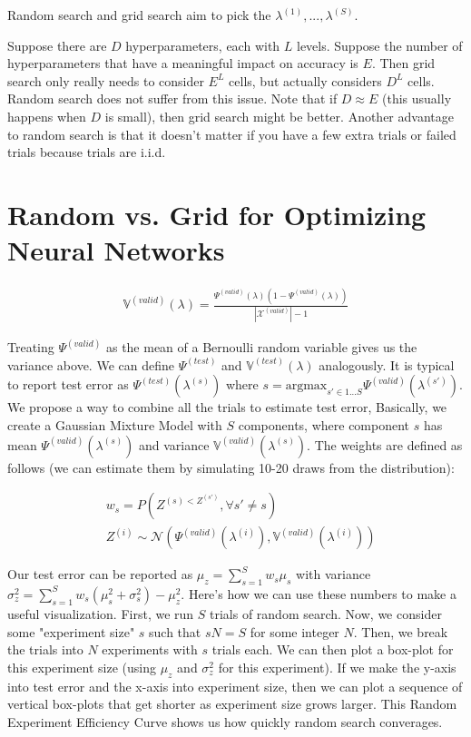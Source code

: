 \documentclass[a4paper]{article}
\begin{document}
Random search and grid search aim to pick the $\lambda^{(1)}, ...,
\lambda^{(S)}$.

Suppose there are $D$ hyperparameters, each with $L$ levels. Suppose the number
of hyperparameters that have a meaningful impact on accuracy is $E$. Then grid
search only really needs to consider $E^L$ cells, but actually considers $D^L$
cells. Random search does not suffer from this issue. Note that if
$D \approx E$ (this usually happens when $D$ is small), then grid search might
be better. Another advantage to random search is that it doesn't matter if you
have a few extra trials or failed trials because trials are i.i.d.

\section{Random vs. Grid for Optimizing Neural Networks}

\begin{align}
  \mathbb{V}^{(valid)}(\lambda) = \frac{\Psi^{(valid)}(\lambda) (1 -
  \Psi^{(valid)}(\lambda))}{|\mathcal{X}^{(valid)}| - 1}
\end{align}

Treating $\Psi^{(valid)}$ as the mean of a Bernoulli random variable gives us
the variance above. We can define $\Psi^{(test)}$ and
$\mathbb{V}^{(test)}(\lambda)$ analogously. It is typical to report test error
as $\Psi^{(test)}(\lambda^{(s)})$ where $s = \text{argmax}_{s' \in 1...S}{
\Psi^{(valid)}(\lambda^{(s')})}$. We propose a way to combine all the
trials to estimate test error, Basically, we create a Gaussian Mixture Model
with $S$ components, where component $s$ has mean
$\Psi^{(valid)}(\lambda^{(s)})$ and variance
$\mathbb{V}^{(valid)}(\lambda^{(s)})$. The weights are defined as follows
(we can estimate them by simulating 10-20 draws from the distribution):

\begin{align}
  & w_s = P(Z^{(s) < Z^{(s')}}, \forall s' \ne s) \\
  & Z^{(i)} \sim \mathcal{N}(
    \Psi^{(valid)}(\lambda^{(i)}),
    \mathbb{V}^{(valid)}(\lambda^{(i)})
  )
\end{align}

Our test error can be reported as $\mu_z = \sum_{s=1}^{S}{w_s \mu_s}$ with
variance $\sigma_z^2 = \sum_{s=1}^{S}{w_s (\mu_s^2 + \sigma_s^2)} - \mu_z^2$.
Here's how we can use these numbers to make a useful visualization. First,
we run $S$ trials of random search. Now, we consider some "experiment size"
$s$ such that $sN = S$ for some integer $N$. Then, we break the trials into
$N$ experiments with $s$ trials each. We can then plot a box-plot for this
experiment size (using $\mu_z$ and $\sigma_z^2$ for this experiment). If
we make the y-axis into test error and the x-axis into experiment size, then we
can plot a sequence of vertical box-plots that get shorter as experiment size
grows larger. This Random Experiment Efficiency Curve shows us how quickly
random search converages.
\end{document}
